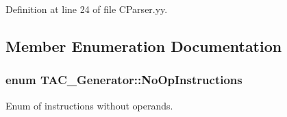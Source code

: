 Definition at line 24 of file C\-Parser.\-yy.



\subsection{Member Enumeration Documentation}
\hypertarget{classTAC__Generator_a3942f3e280fb83e44ad85eb13d56dfb5}{
\subsubsection[{No\-Op\-Instructions}]{\setlength{\rightskip}{0pt plus 5cm}enum {\bf T\-A\-C\-\_\-\-Generator\-::\-No\-Op\-Instructions}}}\label{classTAC__Generator_a3942f3e280fb83e44ad85eb13d56dfb5}


Enum of instructions without operands. 

